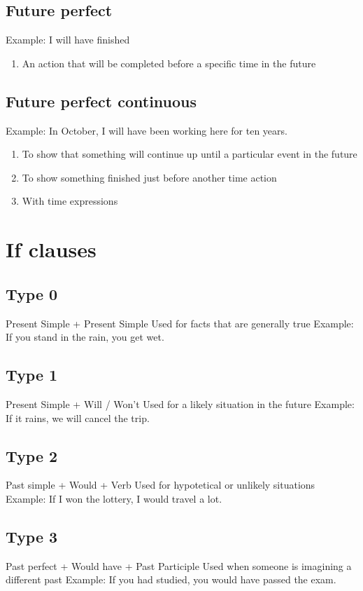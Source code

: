 \documentclass{article}
\begin{document}
    \subsection{Future perfect}

    Example: I will have finished

    \begin{enumerate}
        \item An action that will be completed before a specific time in the future
    \end{enumerate}

    \subsection{Future perfect continuous}

    Example: In October, I will have been working here for ten years.

    \begin{enumerate}
        \item To show that something will continue up until a particular event in the future
        \item To show something finished just before another time action
        \item With time expressions
    \end{enumerate}

    \section{If clauses}

    \subsection{Type 0}

    Present Simple + Present Simple
    Used for facts that are generally true
    Example: If you stand in the rain, you get wet.

    \subsection{Type 1}

    Present Simple + Will / Won't
    Used for a likely situation in the future
    Example: If it rains, we will cancel the trip.

    \subsection{Type 2}

    Past simple + Would + Verb
    Used for hypotetical or unlikely situations
    Example: If I won the lottery, I would travel a lot.

    \subsection{Type 3}

    Past perfect + Would have + Past Participle
    Used when someone is imagining a different past
    Example: If you had studied, you would have passed the exam.
\end{document}
